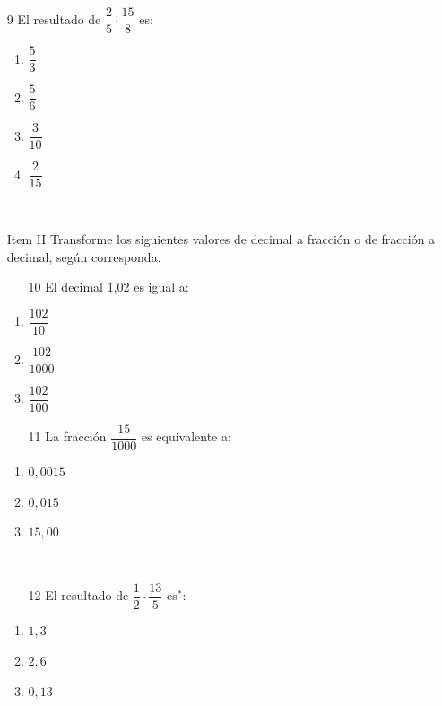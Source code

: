 \documentclass[12pt]{article}
\begin{document}
\begin{enumerate}
	\item [9]El resultado de $\dfrac{2}{5} \cdot \dfrac{15}{8}$	es:
	\begin{enumerate}
		\item $\dfrac{5}{3}$\\
		\item $\dfrac{5}{6}$\\
		\item $\dfrac{3}{10}$\\
		\item $\dfrac{2}{15}$\\
	\end{enumerate}
\ \\ 
\item [Item II] Transforme los siguientes valores de decimal a fracción o de fracción a decimal, según corresponda. 
\begin{multicols}{2}
	\begin{enumerate}
		\item [10] El decimal 1,02 es igual a:
	\end{enumerate}
		\begin{enumerate}
			\item $\dfrac{102}{10}$\\
			\item $\dfrac{102}{1000}$\\
			\item $\dfrac{102}{100}$\\
			\end{enumerate}

	\begin{enumerate}
		\item [11]La fracción $\dfrac{15}{1000}$	 es equivalente a:
			\end{enumerate}
		\begin{enumerate}
			\item $0,0015$\\
			\item $0,015$\\
			\item $15,00$\\
	\end{enumerate}
\end{multicols}
\ \\ 
	\begin{enumerate}
		\item [12]El resultado de $\dfrac{1}{2} \cdot \dfrac{13}{5}$  es$^\ast$: 		\\
			\end{enumerate}
		\begin{enumerate}
			\item $1,3$\\
			\item $2,6$\\
			\item $0,13$\\
			

\end{enumerate}
\end{enumerate}
\end{document}
